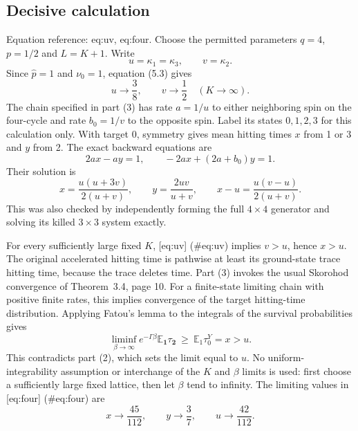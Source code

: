 \documentclass[10pt]{article}
\begin{document}
\subsection*{Decisive calculation}
Equation reference: eq:uv, eq:four. Choose the permitted parameters \(q=4\), \(p=1/2\) and \(L=K+1\). Write \[u=\kappa_1=\kappa_3,\qquad v=\kappa_2.\] Since \(\widehat p=1\) and \(\nu_0=1\), equation (5.3) gives \[
 u\longrightarrow \frac38,\qquad v\longrightarrow\frac12
 \quad(K\to\infty).\] The chain specified in part (3) has rate \(a=1/u\) to either neighboring spin on the four-cycle and rate \(b_0=1/v\) to the opposite spin. Label its states \(0,1,2,3\) for this calculation only. With target 0, symmetry gives mean hitting times \(x\) from 1 or 3 and \(y\) from 2. The exact backward equations are \[2ax-ay=1,\qquad -2ax+(2a+b_0)y=1.\] Their solution is \[
 x=\frac{u(u+3v)}{2(u+v)},\qquad
 y=\frac{2uv}{u+v},\qquad
 x-u=\frac{u(v-u)}{2(u+v)}.\] This was also checked by independently forming the full \(4\times4\) generator and solving its killed \(3\times3\) system exactly.\par
For every sufficiently large fixed \(K\), [eq:uv] (\#eq:uv) implies \(v>u\), hence \(x>u\). The original accelerated hitting time is pathwise at least its ground-state trace hitting time, because the trace deletes time. Part (3) invokes the usual Skorohod convergence of Theorem 3.4, page 10. For a finite-state limiting chain with positive finite rates, this implies convergence of the target hitting-time distribution. Applying Fatou’s lemma to the integrals of the survival probabilities gives \[\liminf_{\beta\to\infty} e^{-\Gamma\beta}
       {\mathbb E}_{\mathbf1}\tau_{\mathbf2}
 \ \geq\ {\mathbb E}_{1}\tau_0^Y=x>u.\] This contradicts part (2), which sets the limit equal to \(u\). No uniform-integrability assumption or interchange of the \(K\) and \(\beta\) limits is used: first choose a sufficiently large fixed lattice, then let \(\beta\) tend to infinity. The limiting values in [eq:four] (\#eq:four) are \[x\to\frac{45}{112},\qquad y\to\frac37,
 \qquad u\to\frac{42}{112}.\]\par
\end{document}
